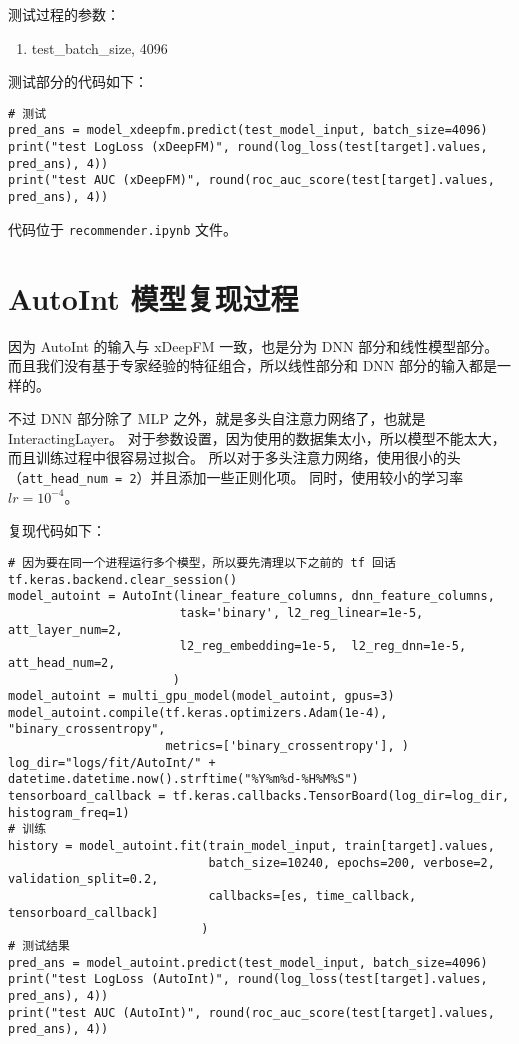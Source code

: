 \documentclass[degree=master,cjk-font=noto]{thuthesis}
\begin{document}
测试过程的参数：

\begin{enumerate}
  \item test\_batch\_size, 4096
\end{enumerate}

测试部分的代码如下：

  \begin{verbatim}
# 测试
pred_ans = model_xdeepfm.predict(test_model_input, batch_size=4096)
print("test LogLoss (xDeepFM)", round(log_loss(test[target].values, pred_ans), 4))
print("test AUC (xDeepFM)", round(roc_auc_score(test[target].values, pred_ans), 4))
  \end{verbatim}


代码位于 \texttt{recommender.ipynb} 文件。

\section{AutoInt 模型复现过程}
\label{sec:autoint_reproduce}

因为 AutoInt 的输入与 xDeepFM 一致，也是分为 DNN 部分和线性模型部分。
而且我们没有基于专家经验的特征组合，所以线性部分和 DNN 部分的输入都是一样的。

不过 DNN 部分除了 MLP 之外，就是多头自注意力网络了，也就是 InteractingLayer。
对于参数设置，因为使用的数据集太小，所以模型不能太大，而且训练过程中很容易过拟合。
所以对于多头注意力网络，使用很小的头（\texttt{att\_head\_num = 2}）并且添加一些正则化项。
同时，使用较小的学习率 $lr = 10^{-4}$。

复现代码如下：


  \begin{verbatim}
# 因为要在同一个进程运行多个模型，所以要先清理以下之前的 tf 回话
tf.keras.backend.clear_session()
model_autoint = AutoInt(linear_feature_columns, dnn_feature_columns,
                        task='binary', l2_reg_linear=1e-5, att_layer_num=2,
                        l2_reg_embedding=1e-5,  l2_reg_dnn=1e-5, att_head_num=2,
                       )
model_autoint = multi_gpu_model(model_autoint, gpus=3)
model_autoint.compile(tf.keras.optimizers.Adam(1e-4), "binary_crossentropy",
                      metrics=['binary_crossentropy'], )
log_dir="logs/fit/AutoInt/" + datetime.datetime.now().strftime("%Y%m%d-%H%M%S")
tensorboard_callback = tf.keras.callbacks.TensorBoard(log_dir=log_dir, histogram_freq=1)
# 训练
history = model_autoint.fit(train_model_input, train[target].values,
                            batch_size=10240, epochs=200, verbose=2, validation_split=0.2,
                            callbacks=[es, time_callback, tensorboard_callback]
                           )
# 测试结果
pred_ans = model_autoint.predict(test_model_input, batch_size=4096)
print("test LogLoss (AutoInt)", round(log_loss(test[target].values, pred_ans), 4))
print("test AUC (AutoInt)", round(roc_auc_score(test[target].values, pred_ans), 4))
  \end{verbatim}
\end{document}
